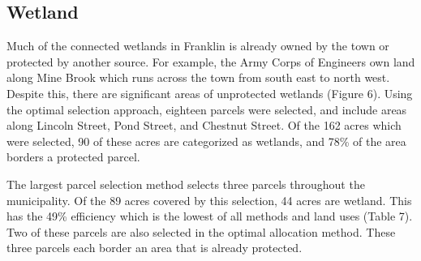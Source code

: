 \documentclass[12pt, stu, floatsintext,table]{apa7}
\begin{document}
\begin{table}[hbtp]
\caption{Summary of forested parcel selections using three methods.} 
\end{table}
\subsection{Wetland}
Much of the connected wetlands in Franklin is already owned by the town or protected by another source. For example, the Army Corps of Engineers own land along Mine Brook which runs across the town from south east to north west. Despite this, there are significant areas of unprotected wetlands (Figure 6).  
Using the optimal selection approach, eighteen parcels were selected, and include areas along Lincoln Street, Pond Street, and Chestnut Street. Of the 162 acres which were selected, 90 of these acres are categorized as wetlands, and 78\% of the area borders a protected parcel. 

The largest parcel selection method selects three parcels throughout the municipality. Of the 89 acres covered by this selection, 44 acres are wetland. This has the 49\% efficiency which is the lowest of all methods and land uses (Table 7). Two of these parcels are also selected in the optimal allocation method. These three parcels each border an area that is already protected.
\end{document}
